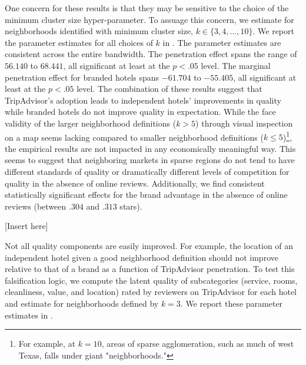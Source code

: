 \documentclass{informs_mod} %
\begin{document}
One concern for these results is that they may be sensitive to the choice of the minimum cluster size hyper-parameter. To assuage this concern, we estimate  for neighborhoods identified with minimum cluster size, $k\in\{3,4,...,10\}$. We report the parameter estimates for all choices of $k$ in . The parameter estimates are consistent across the entire bandwidth. The penetration effect spans the range of $56.140$ to $68.441$, all significant at least at the $p<.05$ level. The marginal penetration effect for branded hotels spans $-61.704$ to $-55.405$, all significant at least at the $p<.05$ level. The combination of these results suggest that TripAdvisor's adoption leads to independent hotels' improvements in quality while branded hotels do not improve quality in expectation. While the face validity of the larger neighborhood definitions ($k>5$) through visual inspection on a map seems lacking compared to smaller neighborhood definitions ($k\le 5$)\footnote{For example, at $k=10$, areas of sparse agglomeration, such as much of west Texas, falls under giant "neighborhoods."}, the empirical results are not impacted in any economically meaningful way. This seems to suggest that neighboring markets in sparse regions do not tend to have different standards of quality or dramatically different levels of competition for quality in the absence of online reviews. Additionally, we find consistent statistically significant effects for the brand advantage in the absence of online reviews (between $.304$ and $.313$ stars). 

[Insert  here]

Not all quality components are easily improved. For example, the location of an independent hotel given a good neighborhood definition should not improve relative to that of a brand as a function of TripAdvisor penetration. To test this falsification logic, we compute the latent quality of subcategories (service, rooms, cleanliness, value, and location) rated by reviewers on TripAdvisor for each hotel and estimate  for neighborhoods defined by $k=3$. We report these parameter estimates in . 
\end{document}
